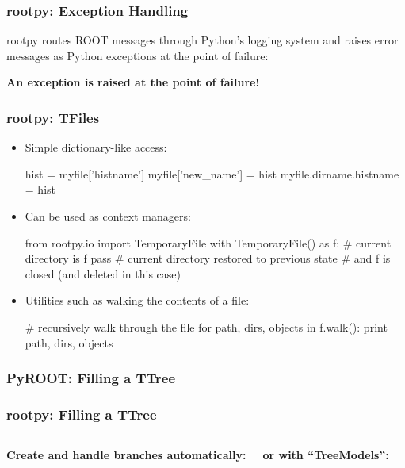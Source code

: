 \documentclass[10pt,professionalfonts,serif,usenames,dvipsnames,svgnames,table]{beamer}
\begin{document}
\begin{frame}[fragile]
    \frametitle{rootpy: Exception Handling}

rootpy routes ROOT messages through Python's logging system and raises error
messages as Python exceptions at the point of failure:

    
    \vspace{-.5cm}
    
    \begin{center}
        \vspace{-.5cm}
    {\bf An exception is raised at the point of failure!}
    \end{center}
\end{frame}

\begin{frame}[fragile]
    \frametitle{rootpy: TFiles}
    \begin{itemize}
\item Simple dictionary-like access:
\begin{pyglist}[language=python,style=vs]
hist = myfile['histname']
myfile['new_name'] = hist
myfile.dirname.histname = hist
\end{pyglist}
    \item Can be used as context managers:
\begin{pyglist}[language=python,style=vs]
from rootpy.io import TemporaryFile
with TemporaryFile() as f:
    # current directory is f
    pass
# current directory restored to previous state
# and f is closed (and deleted in this case)
\end{pyglist}
    \item Utilities such as walking the contents of a file:   
\begin{pyglist}[language=python,style=vs]
# recursively walk through the file
for path, dirs, objects in f.walk():
    print path, dirs, objects
\end{pyglist}
\end{itemize}
\end{frame}

\begin{frame}[fragile]
    \frametitle{PyROOT: Filling a TTree}
    
\end{frame}

\begin{frame}[fragile]
    \frametitle{rootpy: Filling a TTree}
    \begin{columns}
        {\bf Create and handle branches automatically:}
        
        {\bf or with ``TreeModels'':}
        
    \end{columns}
\end{frame}
\end{document}
